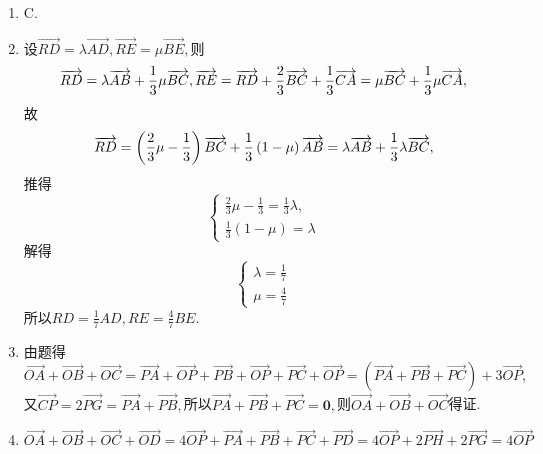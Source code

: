\documentclass[UTF8]{ctexart}
\begin{document}
\begin{enumerate}
\item C.

\item 设$\overrightarrow{RD}=\lambda\overrightarrow{AD},\overrightarrow{RE}=\mu\overrightarrow{BE},$则$$\overrightarrow{RD}=\lambda\overrightarrow{AB}+\displaystyle\frac{1}{3}\mu\\ \overrightarrow{BC},\overrightarrow{RE}=\overrightarrow{RD}+\displaystyle\frac{2}{3}\overrightarrow{BC}+\displaystyle\frac{1}{3}\overrightarrow{CA}=\mu \overrightarrow{BC}+\displaystyle\frac{1}{3}\mu \overrightarrow{CA},$$故$$\overrightarrow{RD}=\left(\displaystyle\frac{2}{3}\mu-\displaystyle\frac{1}{3}\right)\overrightarrow{BC}+\displaystyle\frac{1}{3}\left(1-\mu\right)\overrightarrow{AB}=\lambda\overrightarrow{AB}+\displaystyle\frac{1}{3}\lambda\\\overrightarrow{BC},$$推得$$\left\{\begin{array}{ll}\displaystyle\frac{2}{3}\mu-\displaystyle\frac{1}{3}=\displaystyle\frac{1}{3}\lambda,\\ \displaystyle\frac{1}{3}\left(1-\mu\right)=\lambda\end{array}\right.$$解得$$\left\{\begin{array}{ll}\lambda=\displaystyle\frac{1}{7}\\ \mu=\displaystyle\frac{4}{7}\end{array}\right. $$所以$RD=\displaystyle\frac{1}{7}AD,RE=\displaystyle\frac{4}{7}BE$.

\item 由题得$$\overrightarrow{OA}+\overrightarrow{OB}+\overrightarrow{OC}=\overrightarrow{PA}+\overrightarrow{OP}+\overrightarrow{PB}+\overrightarrow{OP}+\overrightarrow{PC}+\overrightarrow{OP}=\left(\overrightarrow{PA}+\overrightarrow{PB}+\overrightarrow{PC}\right)+3\overrightarrow{OP},$$又$\overrightarrow{CP}=2\overrightarrow{PG}=\overrightarrow{PA}+\overrightarrow{PB},$所以$\overrightarrow{PA}+\overrightarrow{PB}+\overrightarrow{PC}=\mathbf{0},$则$\overrightarrow{OA}+\overrightarrow{OB}+\overrightarrow{OC}$得证. 

\item $\overrightarrow{OA}+\overrightarrow{OB}+\overrightarrow{OC}+\overrightarrow{OD}=4\overrightarrow{OP}+\overrightarrow{PA}+\overrightarrow{PB}+\overrightarrow{PC}+\overrightarrow{PD}=4\overrightarrow{OP}+2\overrightarrow{PH}+2\overrightarrow{PG}=4\overrightarrow{OP}$


\end{enumerate}
\end{document}
